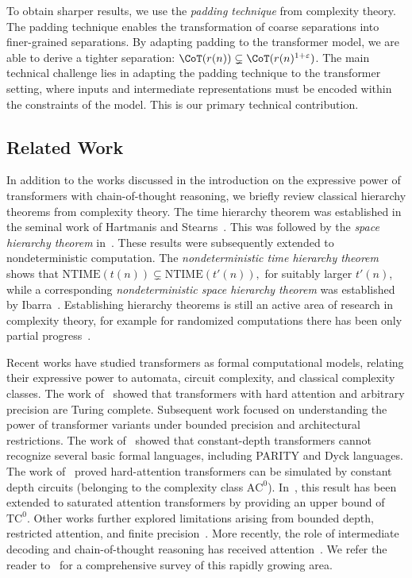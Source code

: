 To obtain sharper results, we use the {\em padding technique} from complexity theory. 
The padding technique enables the transformation of coarse separations into finer-grained separations.
By adapting padding to the transformer model, we are able to derive a tighter separation:
$\CoT(r(n)) \subsetneq \CoT(r(n)^{1+\varepsilon})$. 
The main technical challenge lies in adapting the padding technique to the transformer setting, where inputs and intermediate representations must be encoded within the constraints of the model. This is our primary technical contribution. 
\subsection{Related Work}
In addition to the works discussed in the introduction on the expressive power of transformers with chain-of-thought reasoning, we briefly review classical hierarchy theorems from complexity theory. The time hierarchy theorem was established in the seminal work of Hartmanis and Stearns~\cite{hartmanis1965computational}. This was followed by the \emph{space hierarchy theorem} in~\cite{StearnsHartmanisLewis1965}. 
These results were subsequently extended to nondeterministic computation. The \emph{nondeterministic time hierarchy theorem}~\cite{Cook1973,SeiferasFischerMeyer1978} shows that
$
\mathrm{NTIME}(t(n)) \subsetneq \mathrm{NTIME}(t'(n)),
$
for suitably larger $t'(n)$, while a corresponding \emph{nondeterministic space hierarchy theorem} was established by Ibarra~\cite{Ibarra1967}. Establishing hierarchy theorems is still an active area of research in complexity theory, for example for randomized computations there has been only partial progress~\cite{Barak02,FortnowS04,FortnowST05}.

Recent works have studied transformers as formal computational models, relating their expressive power to automata, circuit complexity, and classical complexity classes. The work of~\cite{perez2021attention} showed that transformers with hard attention and arbitrary precision are Turing complete. Subsequent work focused on understanding the power of transformer variants under bounded precision and architectural restrictions. The work of~\cite{hahn2020theoretical} showed that constant-depth transformers cannot recognize several basic formal languages, including PARITY and Dyck languages. The work of~\cite{hao2022formal} proved hard-attention transformers can be simulated by constant depth circuits (belonging to the complexity class $\mathrm{AC}^0$). In~\cite{merrill2022saturated}, this result has been extended to saturated attention transformers by providing an upper bound of $\mathrm{TC}^0$.
 Other works further explored limitations arising from bounded depth, restricted attention, and finite precision~\cite{chiang2023tighter,liu2023transformers_shortcuts,merrill2023parallelism,merrill2023expressive,PengNarayananPapadimitriou2024}. More recently, the role of intermediate decoding and chain-of-thought reasoning has received attention~\cite{merrill2023expressive,ChenPW25}. We refer the reader to~\cite{Strobl_2024} for a comprehensive survey of this rapidly growing area.